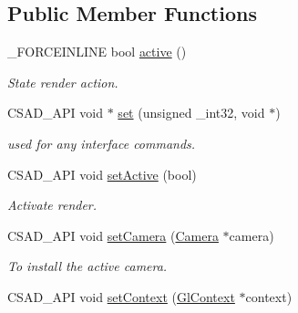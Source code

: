 \subsection*{Public Member Functions}
\begin{DoxyCompactItemize}
\item 
\hypertarget{classcsad_1_1_renderer_acd653a15f123687e861eecd85cf108e5}{\-\_\-\-F\-O\-R\-C\-E\-I\-N\-L\-I\-N\-E bool \hyperlink{classcsad_1_1_renderer_acd653a15f123687e861eecd85cf108e5}{active} ()}\label{classcsad_1_1_renderer_acd653a15f123687e861eecd85cf108e5}

\begin{DoxyCompactList}\small\item\em State render action. \end{DoxyCompactList}\item 
\hypertarget{classcsad_1_1_renderer_a8df6bef44d21868c4db3ca169dc43435}{C\-S\-A\-D\-\_\-\-A\-P\-I void $\ast$ \hyperlink{classcsad_1_1_renderer_a8df6bef44d21868c4db3ca169dc43435}{set} (unsigned \-\_\-int32, void $\ast$)}\label{classcsad_1_1_renderer_a8df6bef44d21868c4db3ca169dc43435}

\begin{DoxyCompactList}\small\item\em used for any interface commands. \end{DoxyCompactList}\item 
\hypertarget{classcsad_1_1_renderer_a9b03a830548238e1c35ab33107d498aa}{C\-S\-A\-D\-\_\-\-A\-P\-I void \hyperlink{classcsad_1_1_renderer_a9b03a830548238e1c35ab33107d498aa}{set\-Active} (bool)}\label{classcsad_1_1_renderer_a9b03a830548238e1c35ab33107d498aa}

\begin{DoxyCompactList}\small\item\em Activate render. \end{DoxyCompactList}\item 
\hypertarget{classcsad_1_1_renderer_a02aa5803dde3a7a95a042c70946c3a1a}{C\-S\-A\-D\-\_\-\-A\-P\-I void \hyperlink{classcsad_1_1_renderer_a02aa5803dde3a7a95a042c70946c3a1a}{set\-Camera} (\hyperlink{classcsad_1_1_camera}{Camera} $\ast$camera)}\label{classcsad_1_1_renderer_a02aa5803dde3a7a95a042c70946c3a1a}

\begin{DoxyCompactList}\small\item\em To install the active camera. \end{DoxyCompactList}\item 
\hypertarget{classcsad_1_1_renderer_a798c23f5ea9a56e190813064fd6fda3c}{C\-S\-A\-D\-\_\-\-A\-P\-I void \hyperlink{classcsad_1_1_renderer_a798c23f5ea9a56e190813064fd6fda3c}{set\-Context} (\hyperlink{classcsad_1_1_gl_context}{Gl\-Context} $\ast$context)}\label{classcsad_1_1_renderer_a798c23f5ea9a56e190813064fd6fda3c}


\end{DoxyCompactItemize}
